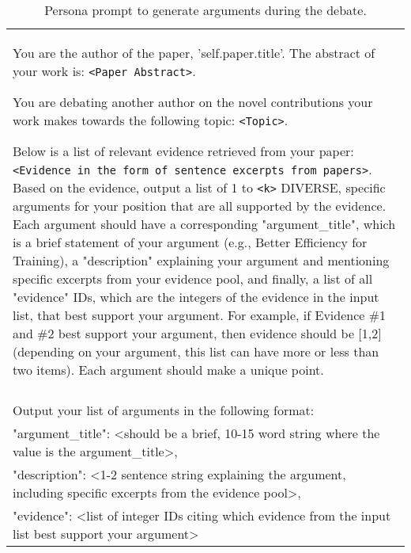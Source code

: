 \begin{table*}[h]
\centering
\begin{tabularx}{\textwidth}{|X|}
\hline
You are the author of the paper, '{self.paper.title}'. The abstract of your work is: \texttt{<Paper Abstract>}.

You are debating another author on the novel contributions your work makes towards the following topic: \texttt{<Topic>}.

Below is a list of relevant evidence retrieved from your paper:\texttt{<Evidence in the form of sentence excerpts from papers>}. Based on the evidence, output a list of 1 to \texttt{<k>} DIVERSE, specific arguments for your position that are all supported by the evidence. Each argument should have a corresponding "argument\_title", which is a brief statement of your argument (e.g., Better Efficiency for Training), a "description" explaining your argument and mentioning specific excerpts from your evidence pool, and finally, a list of all "evidence" IDs, which are the integers of the evidence in the input list, that best support your argument. For example, if Evidence \#1 and \#2 best support your argument, then evidence should be [1,2] (depending on your argument, this list can have more or less than two items). Each argument should make a unique point.
\\\\
Output your list of arguments in the following format: \\
                "argument\_title": <should be a brief, 10-15 word string where the value is the argument\_title>, \\
                "description": <1-2 sentence string explaining the argument, including specific excerpts from the evidence pool>, \\
                "evidence": <list of integer IDs citing which evidence from the input list best support your argument>
 \\ \hline
\end{tabularx}
\caption{Persona prompt to generate arguments during the debate.}
\label{prompt_persona: generate_arguments}
\end{table*}

